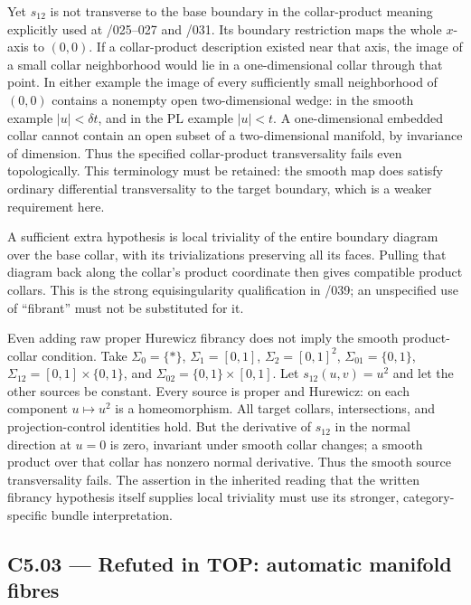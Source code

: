 Yet \(s_{12}\) is not transverse to the base boundary in the collar-product meaning explicitly used at /025--027 and /031. Its boundary restriction maps the whole \(x\)-axis to \((0,0)\). If a collar-product description existed near that axis, the image of a small collar neighborhood would lie in a one-dimensional collar through that point. In either example the image of every sufficiently small neighborhood of \((0,0)\) contains a nonempty open two-dimensional wedge: in the smooth example \(|u|<\delta t\), and in the PL example \(|u|<t\). A one-dimensional embedded collar cannot contain an open subset of a two-dimensional manifold, by invariance of dimension. Thus the specified collar-product transversality fails even topologically. This terminology must be retained: the smooth map does satisfy ordinary differential transversality to the target boundary, which is a weaker requirement here.

A sufficient extra hypothesis is local triviality of the entire boundary diagram over the base collar, with its trivializations preserving all its faces. Pulling that diagram back along the collar's product coordinate then gives compatible product collars. This is the strong equisingularity qualification in /039; an unspecified use of ``fibrant'' must not be substituted for it.

Even adding raw proper Hurewicz fibrancy does not imply the smooth product-collar condition. Take \(\Sigma_0=\{*\}\), \(\Sigma_1=[0,1]\), \(\Sigma_2=[0,1]^2\), \(\Sigma_{01}=\{0,1\}\), \(\Sigma_{12}=[0,1]\times\{0,1\}\), and \(\Sigma_{02}=\{0,1\}\times[0,1]\). Let \(s_{12}(u,v)=u^2\) and let the other sources be constant. Every source is proper and Hurewicz: on each component \(u\mapsto u^2\) is a homeomorphism. All target collars, intersections, and projection-control identities hold. But the derivative of \(s_{12}\) in the normal direction at \(u=0\) is zero, invariant under smooth collar changes; a smooth product over that collar has nonzero normal derivative. Thus the smooth source transversality fails. The assertion in the inherited reading that the written fibrancy hypothesis itself supplies local triviality must use its stronger, category-specific bundle interpretation.

\subsection{C5.03 --- Refuted in TOP: automatic manifold fibres}\label{c5.03-refuted-in-top-automatic-manifold-fibres}

